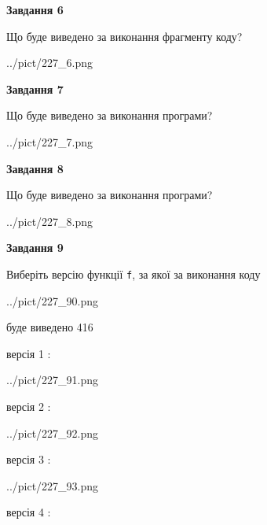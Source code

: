 \documentclass[12pt, ukrainian]{article}
\def\code#1{\Verb!#1!}
\begin{document}
{\begin {large}
{\begin {center}\textbf{Завдання 6}\end {center}}

Що буде виведено за виконання фрагменту коду?\par
\begin{center}
	{../pict/227_6.png}
\end{center}
\newpage

{\begin {center}\textbf{Завдання 7}\end {center}}

Що буде виведено за виконання програми?\par
\begin{center}
	{../pict/227_7.png}
\end{center}
\newpage

{\begin {center}\textbf{Завдання 8}\end {center}}

Що буде виведено за виконання програми?\par
\begin{center}
	{../pict/227_8.png}
\end{center}
\newpage

{\begin {center}\textbf{Завдання 9}\end {center}}

Виберіть версію функції \code{f}, за якої за виконання коду
\begin{center}
	{../pict/227_90.png}
\end{center}
буде виведено 416

\vspace{5mm}
версія 1 :

\begin{center}
	{../pict/227_91.png}
\end{center}
версія 2 :

\begin{center}
	{../pict/227_92.png}
\end{center}
версія 3 :

\begin{center}
	{../pict/227_93.png}
\end{center}
версія 4 :


\end{large}}
\end{document}
